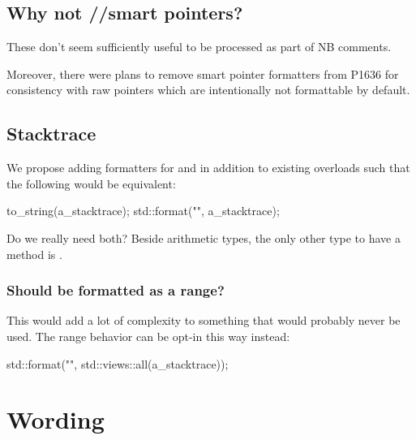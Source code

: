 \documentclass{wg21}
\begin{document}
\subsection{Why not //smart pointers?}

These don't seem sufficiently useful to be processed as part of NB comments.

Moreover, there were plans to remove smart pointer formatters from P1636 for consistency with raw pointers which are intentionally not formattable by default.

\subsection{Stacktrace}

We propose adding formatters for  and  in addition to existing  overloads such that the following would be equivalent:

\begin{colorblock}
to_string(a_stacktrace);
std::format("{}", a_stacktrace);
\end{colorblock}

Do we really need both?
Beside arithmetic types, the only other type to have a  method is .

\subsubsection{Should  be formatted as a range?}

This would add a lot of complexity to something that would probably never be used.
The range behavior can be opt-in this way instead:

\begin{colorblock}
std::format("{}", std::views::all(a_stacktrace));
\end{colorblock}

\section{Wording}
\end{document}

